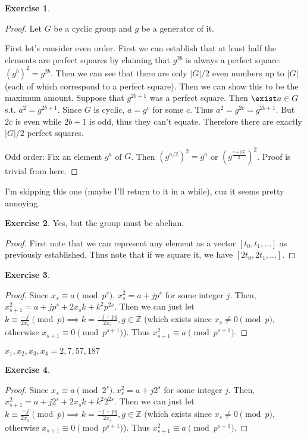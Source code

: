 \documentclass[11pt]{article}
\theoremstyle{definition}
\newtheorem{exercise}{{Exercise}}
\newcommand{\Z}{\mathbb{Z}}
\begin{document}
\begin{exercise}
	\begin{proof}
		Let $G$ be a cyclic group and $g$ be a generator of it.

		First let's consider even order. First we can establish that at least half the elements are perfect squares by claiming that $g^{2b}$ is always a perfect square: $(g^b)^2 = g^{2b}$. Then we can see that there are only $|G|/2$ even numbers up to $|G|$ (each of which correspond to a perfect square). Then we can show this to be the maximum amount. Suppose that $g^{2b+1}$ was a perfect square. Then $\exist a \in G$ s.t. $a^2 = g^{2b+1}$. Since $G$ is cyclic, $a = g^c$ for some $c$. Thus $a^2 = g^{2c} = g^{2b+1}$. But $2c$ is even while $2b+1$ is odd, thus they can't equate. Therefore there are exactly $|G|/2$ perfect squares.

		Odd order: Fix an element $g^a$ of $G$. Then $(g^{a/2})^2 = g^a$ or $\left(g^{\frac{a+|G|}{2}}\right)^2$. Proof is trivial from here.
	\end{proof}
\end{exercise}

I'm skipping this one (maybe I'll return to it in a while), cuz it seems pretty annoying.
\begin{exercise}
	Yes, but the group must be abelian.
\begin{proof}
	First note that we can represent any element as a vector $[t_0, t_1, \ldots]$ as previously established. Thus note that if we square it, we have $[2t_0, 2t_1, \ldots]$.
\end{proof}
\end{exercise}

\begin{exercise}
\begin{proof}
	Since $x_s \equiv a \pmod{p^s}$, $x_s^2 = a + jp^s$ for some integer $j$. Then, $x_{s+1}^2 = a + jp^s + 2x_sk + k^2p^{2s}$. Then we can just let $k \equiv \frac{-j}{2x_s} \pmod{p} \implies k = \frac{-j + pg}{2x_s}, g\in\Z$ (which exists since $x_s \ne 0 \pmod{p}$, otherwise $x_{s+1} \equiv 0 \pmod{p^{s+1}}$). Thus $x_{s+1}^2 \equiv a \pmod{p^{s+1}}$. 
\end{proof}
$x_1,x_2,x_3,x_4 = 2, 7, 57, 187$
\end{exercise}

\begin{exercise}
	\begin{proof}
		Since $x_s \equiv a \pmod{2^s}, x_s^2 = a + j2^s$ for some integer $j$. Then, $x_{s+1}^2 = a + j2^s + 2x_sk + k^2 2^{2s}$.
		Then we can just let $k \equiv \frac{-j}{2x_s} \pmod{p} \implies k = \frac{-j + pg}{2x_s}, g\in\Z$ (which exists since $x_s \ne 0 \pmod{p}$, otherwise $x_{s+1} \equiv 0 \pmod{p^{s+1}}$). Thus $x_{s+1}^2 \equiv a \pmod{p^{s+1}}$. 
	\end{proof}	
\end{exercise}
\end{document}
